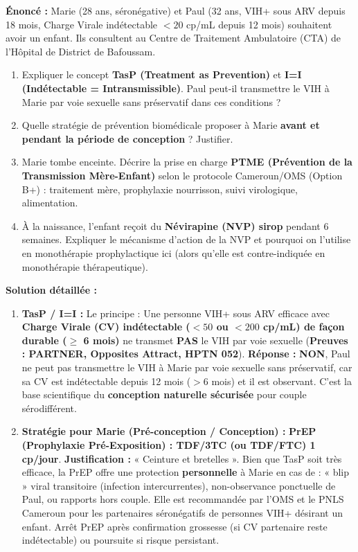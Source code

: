 \documentclass[11pt]{article}
\begin{document}
\begin{exoresolu}
\textbf{Énoncé :} Marie (28 ans, séronégative) et Paul (32 ans, VIH+ sous ARV depuis 18 mois, Charge Virale indétectable $< 20$ cp/mL depuis 12 mois) souhaitent avoir un enfant. Ils consultent au Centre de Traitement Ambulatoire (CTA) de l'Hôpital de District de Bafoussam.
\begin{enumerate}
    \item Expliquer le concept \textbf{TasP (Treatment as Prevention)} et \textbf{I=I (Indétectable = Intransmissible)}. Paul peut-il transmettre le VIH à Marie par voie sexuelle sans préservatif dans ces conditions ?
    \item Quelle stratégie de prévention biomédicale proposer à Marie \textbf{avant et pendant la période de conception} ? Justifier.
    \item Marie tombe enceinte. Décrire la prise en charge \textbf{PTME (Prévention de la Transmission Mère-Enfant)} selon le protocole Cameroun/OMS (Option B+) : traitement mère, prophylaxie nourrisson, suivi virologique, alimentation.
    \item À la naissance, l'enfant reçoit du \textbf{Névirapine (NVP) sirop} pendant 6 semaines. Expliquer le mécanisme d'action de la NVP et pourquoi on l'utilise en monothérapie prophylactique ici (alors qu'elle est contre-indiquée en monothérapie thérapeutique).
\end{enumerate}
\tcblower
\textbf{Solution détaillée :}
\begin{enumerate}
    \item \textbf{TasP / I=I :} Le principe : Une personne VIH+ sous ARV efficace avec \textbf{Charge Virale (CV) indétectable ($< 50$ ou $< 200$ cp/mL) de façon durable ($\ge$ 6 mois)} ne transmet \textbf{PAS} le VIH par voie sexuelle (\textbf{Preuves : PARTNER, Opposites Attract, HPTN 052}).
    \textbf{Réponse :} \textbf{NON}, Paul ne peut pas transmettre le VIH à Marie par voie sexuelle sans préservatif, car sa CV est indétectable depuis 12 mois ($> 6$ mois) et il est observant. C'est la base scientifique du \textbf{conception naturelle sécurisée} pour couple sérodifférent.
    \item \textbf{Stratégie pour Marie (Pré-conception / Conception) :} \textbf{PrEP (Prophylaxie Pré-Exposition) : TDF/3TC (ou TDF/FTC) 1 cp/jour}.
    \textbf{Justification :} « Ceinture et bretelles ». Bien que TasP soit très efficace, la PrEP offre une protection \textbf{personnelle} à Marie en cas de : « blip » viral transitoire (infection intercurrentes), non-observance ponctuelle de Paul, ou rapports hors couple. Elle est recommandée par l'OMS et le PNLS Cameroun pour les partenaires séronégatifs de personnes VIH+ désirant un enfant. Arrêt PrEP après confirmation grossesse (si CV partenaire reste indétectable) ou poursuite si risque persistant.

\end{enumerate}
\end{exoresolu}
\end{document}
